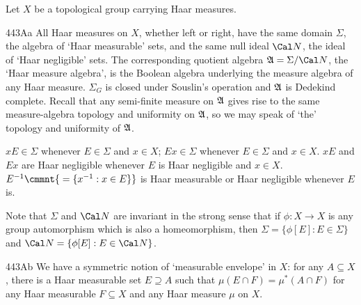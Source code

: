   Let $X$ be a topological group carrying
Haar measures.

\spheader 443Aa All Haar measures on $X$, whether left or right, have
the same domain
$\Sigma$, the algebra of `Haar measurable' sets,
and the same null ideal $\Cal N$, the ideal
of `Haar negligible' sets.   The corresponding quotient algebra
$\frak A=\Sigma/\Cal N$, the `Haar measure algebra', is the Boolean
algebra underlying
the measure algebra of any Haar measure.   $\Sigma_G$ is closed under Souslin's operation and
$\frak A$ is Dedekind complete.   Recall that
any semi-finite measure on $\frak A$ gives rise to the same
measure-algebra topology and uniformity on
$\frak A$, so we may speak of `the' topology and
uniformity of $\frak A$.

$xE\in\Sigma$ whenever $E\in\Sigma$ and $x\in X$;   $Ex\in\Sigma$ whenever
$E\in\Sigma$ and $x\in X$.
 $xE$ and $Ex$ are Haar negligible whenever $E$ is
Haar negligible and $x\in X$.
 $E^{-1}\cmmnt{\mskip5mu =\{x^{-1}:x\in E\}}$ is
Haar measurable or Haar negligible whenever $E$ is.

Note that $\Sigma$ and $\Cal N$ are invariant in the strong sense that if
$\phi:X\to X$ is any group automorphism which
is also a homeomorphism, then $\Sigma=\{\phi[E]:E\in\Sigma\}$ and
$\Cal N=\{\phi[E]:E\in\Cal N\}$.   

\spheader 443Ab We have a symmetric notion of `measurable
envelope' in $X$:  for any $A\subseteq X$, there is a Haar measurable
set $E\supseteq A$ such that $\mu(E\cap F)=\mu^*(A\cap F)$ for any Haar
measurable $F\subseteq X$ and any Haar measure $\mu$ on $X$.

